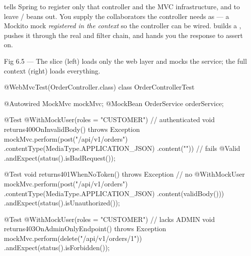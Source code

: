   tells Spring to register only that controller and the MVC infrastructure, and to leave / beans out. You supply the collaborators the controller needs as  --- a Mockito mock \emph{registered in the context} so the controller can be wired.  builds a , pushes it through the real  and filter chain, and hands you the response to assert on.

\begin{wbfigure}{Fig 6.5 --- The slice (left) loads only the web layer and mocks the service; the full context (right) loads everything.}
\end{wbfigure}

\begin{javabox}
@WebMvcTest(OrderController.class)
class OrderControllerTest {

  @Autowired MockMvc mockMvc;
  @MockBean  OrderService orderService;

  @Test
  @WithMockUser(roles = "CUSTOMER")            // authenticated
  void returns400OnInvalidBody() throws Exception {
    mockMvc.perform(post("/api/v1/orders")
            .contentType(MediaType.APPLICATION_JSON)
            .content("{}"))                    // fails @Valid
        .andExpect(status().isBadRequest());
  }

  @Test
  void returns401WhenNoToken() throws Exception {   // no @WithMockUser
    mockMvc.perform(post("/api/v1/orders")
            .contentType(MediaType.APPLICATION_JSON)
            .content(validBody()))
        .andExpect(status().isUnauthorized());
  }

  @Test
  @WithMockUser(roles = "CUSTOMER")            // lacks ADMIN
  void returns403OnAdminOnlyEndpoint() throws Exception {
    mockMvc.perform(delete("/api/v1/orders/1"))
        .andExpect(status().isForbidden());
  }
}
\end{javabox}

